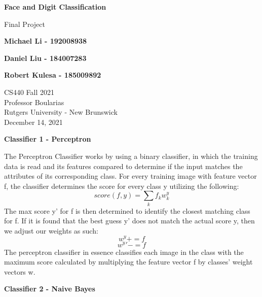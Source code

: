 \documentclass[11pt]{article}
\begin{document}
    \begin{titlepage}
        \begin{center}
            \vspace{1cm}

            \Huge
            \textbf{Face and Digit Classification}

            \vspace{0.5cm}
            \LARGE
            Final Project

            \vspace{1cm}

            \textbf{Michael Li - 192008938}

            \textbf{Daniel Liu - 184007283}

            \textbf{Robert Kulesa - 185009892}


            \vfill


            \vspace{0.8cm}

            \Large
            CS440 Fall 2021\\
            Professor Boularias\\
            Rutgers University - New Brunswick\\
            December 14, 2021

        \end{center}
    \end{titlepage}

    \begin{center}
        \Large
        \textbf{Classifier 1 - Perceptron}
    \end{center}
    \normalsize
    The Perceptron Classifier works by using a binary classifier, in which the training data is read and its features compared to determine if the input matches the attributes of its corresponding class. For every training image with feature vector f, the classifier determines the score for every class y utilizing the following:
    \[score(f,y) = \sum_{k}f_k w_k^y\]
    The max score y' for f is then determined to identify the closest matching class for f. If it is found that the best guess y' does not match the actual score y, then we adjust our weights as such:
    \[w^y += f\]
    \[w^y' -= f\]
    The perceptron classifier in essence classifies each image in the class with the maximum score calculated by multiplying the feature vector f by classes' weight vectors w.

    \begin{center}
        \Large
        \textbf{Classifier 2 - Naive Bayes}
    \end{center}
    \normalsize
\end{document}
